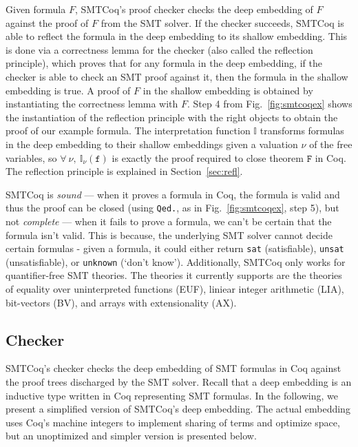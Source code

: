 \documentclass{article}
\begin{document}
	Given formula $F$, SMTCoq's proof 
	checker checks the deep embedding of 
	$F$ against the proof of $F$ from the 
	SMT solver. If the checker succeeds, 
	SMTCoq is able to reflect the formula in 
	the deep embedding to its shallow 
	embedding. This is done via a 
	correctness lemma for the checker
	(also called the reflection principle),
	which proves that for any 
	formula in the deep embedding, if 
	the checker is able to check an SMT
	proof against it, then the formula in 
	the shallow embedding is true. A 
	proof of $F$ in the shallow 
	embedding is obtained by instantiating 
	the correctness lemma with $F$.
	Step 4 from Fig.~\ref{fig:smtcoqex} 
	shows the instantiation of 
	the reflection principle with 
	the right objects to obtain the 
	proof of our example formula. 
	The interpretation function
	$\mathbb{I}$ transforms 
	formulas in the deep embedding
	to their shallow embeddings
	given a valuation $\nu$ of the 
	free variables, so 
	$\forall\ \nu,\ 
	\mathbb{I}_{\nu}(\texttt{f})$
	is exactly the proof required 
	to close theorem $\texttt{F}$
	in Coq. The reflection principle 
	is explained in Section~\ref{sec:refl}.	
	
	SMTCoq is \textit{sound} ---
	when it proves a formula in Coq, the 
	formula is valid and thus the proof
	can be closed (using \texttt{Qed.},
	as in Fig.~\ref{fig:smtcoqex}, 
	step 5), but 
	not \textit{complete} --- when it 
	fails to prove a formula, we can't 
	be certain that the formula isn't 
	valid. This is because, the underlying 
	SMT solver cannot decide certain 
	formulas - given a formula, it could 
	either return \texttt{sat} 
	(satisfiable), \texttt{unsat} 
	(unsatisfiable), or 
	\texttt{unknown} (`don't know').
	Additionally, SMTCoq only works for 
	quantifier-free SMT theories. The 
	theories it currently supports 
	are the theories of equality over
	uninterpreted functions (EUF), 
	liniear integer arithmetic (LIA),
	bit-vectors (BV), and arrays with
	extensionality (AX).
	
	\subsection{Checker}
	\label{sec:checker}
	SMTCoq's checker checks the deep embedding
	of SMT formulas in Coq against the 
	proof trees discharged by the SMT solver.
	Recall that a deep embedding is an
	inductive type written in 
	Coq representing SMT formulas. 
	In the following, we present 
	a simplified version of SMTCoq's 
	deep embedding. The actual embedding 
	uses Coq's machine integers to 
	implement sharing of terms and 
	optimize space, but an unoptimized 
	and simpler version is presented 
	below. 
	
\end{document}
